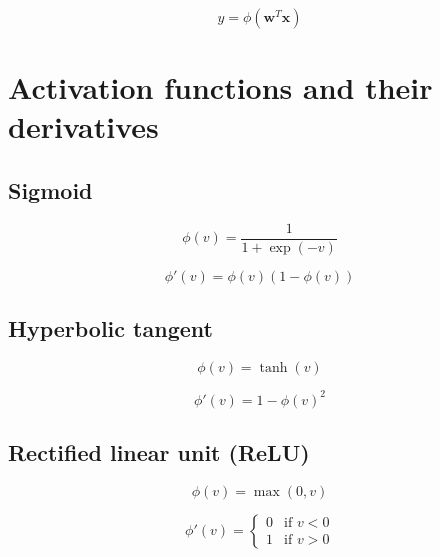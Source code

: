 \begin{equation}\label{eq:perceptron-vector}
y = \phi (\bm{w}^T \bm{x})
\end{equation}


\section{Activation functions and their derivatives}\label{sec:activation-functions}


\subsection{Sigmoid}\label{subsec:sigmoid}

\begin{equation}\label{eq:activation-sigmoid}
    \phi (v) = \frac{1}{1 + \exp(- v)}
\end{equation}

\begin{equation}\label{eq:activation-sigmoid-derivative}
    \phi' (v) = \phi (v) (1 - \phi (v))
\end{equation}


\subsection{Hyperbolic tangent}\label{subsec:hyperbolic-tangent}

\begin{equation}\label{eq:activation-tanh}
    \phi (v) = \tanh (v)
\end{equation}

\begin{equation}\label{eq:activation-tanh-derivative}
    \phi' (v) = 1 - \phi (v)^2
\end{equation}


\subsection{Rectified linear unit (ReLU)}\label{subsec:relu}

\begin{equation}\label{eq:activation-relu}
    \phi (v) = \max (0, v)
\end{equation}

\begin{equation}\label{eq:activation-relu-derivative}
    \phi' (v) =
    \begin{cases}
        0 & \text{if } v < 0 \\
        1 & \text{if } v > 0
    \end{cases}
\end{equation}

